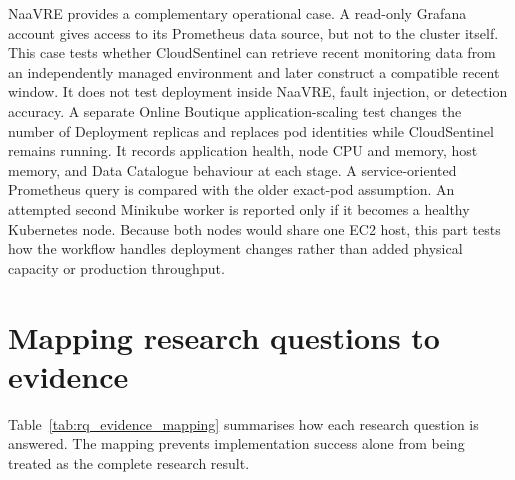 NaaVRE provides a complementary operational case. A read-only Grafana account gives access to its Prometheus data source, but not to the cluster itself. This case tests whether CloudSentinel can retrieve recent monitoring data from an independently managed environment and later construct a compatible recent window. It does not test deployment inside NaaVRE, fault injection, or detection accuracy.
A separate Online Boutique application-scaling test changes the number of Deployment replicas and replaces pod identities while CloudSentinel remains running. It records application health, node CPU and memory, host memory, and Data Catalogue behaviour at each stage. A service-oriented Prometheus query is compared with the older exact-pod assumption. An attempted second Minikube worker is reported only if it becomes a healthy Kubernetes node. Because both nodes would share one EC2 host, this part tests how the workflow handles deployment changes rather than added physical capacity or production throughput.



\section{Mapping research questions to evidence}
Table~\ref{tab:rq_evidence_mapping} summarises how each research question is answered. The mapping prevents implementation success alone from being treated as the complete research result.

